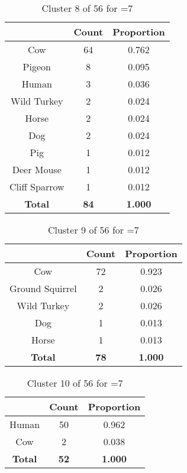 \begin{table}[ht!]
\centering
\begin{tabular}{|c|c|c|}
\hline
\bf \Spec{} &\bf Count &\bf Proportion\\ \hline \hline
Cow & 64 & 0.762\\ \hline
Pigeon & 8 & 0.095\\ \hline
Human & 3 & 0.036\\ \hline
Wild Turkey & 2 & 0.024\\ \hline
Horse & 2 & 0.024\\ \hline
Dog & 2 & 0.024\\ \hline
Pig & 1 & 0.012\\ \hline
Deer Mouse & 1 & 0.012\\ \hline
Cliff Sparrow & 1 & 0.012\\ \hline
\hline
\bf Total & \bf 84 & \bf 1.000\\ \hline
\end{tabular}
\label{tab:cluster:8:7}
\caption{Cluster 8 of 56 for \minneigh{}=7}
\end{table}

\begin{table}[ht!]
\centering
\begin{tabular}{|c|c|c|}
\hline
\bf \Spec{} &\bf Count &\bf Proportion\\ \hline \hline
Cow & 72 & 0.923\\ \hline
Ground Squirrel & 2 & 0.026\\ \hline
Wild Turkey & 2 & 0.026\\ \hline
Dog & 1 & 0.013\\ \hline
Horse & 1 & 0.013\\ \hline
\hline
\bf Total & \bf 78 & \bf 1.000\\ \hline
\end{tabular}
\label{tab:cluster:9:7}
\caption{Cluster 9 of 56 for \minneigh{}=7}
\end{table}

\clearpage
\begin{table}[ht!]
\centering
\begin{tabular}{|c|c|c|}
\hline
\bf \Spec{} &\bf Count &\bf Proportion\\ \hline \hline
Human & 50 & 0.962\\ \hline
Cow & 2 & 0.038\\ \hline
\hline
\bf Total & \bf 52 & \bf 1.000\\ \hline
\end{tabular}
\label{tab:cluster:10:7}
\caption{Cluster 10 of 56 for \minneigh{}=7}
\end{table}

